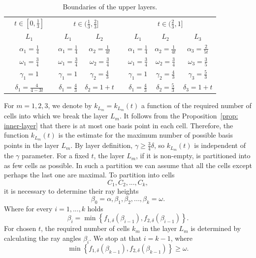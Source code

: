 \begin{table}
\centering
\begin{tabular}{@{}ccccccccc@{}}\toprule
& \multicolumn{1}{c}{$t \in [0,\frac{1}{3}]$} & \phantom{abc}& \multicolumn{2}{c}{$t \in (\frac{1}{3},\frac{2}{3}]$} &
\phantom{abc} & \multicolumn{3}{c}{$t \in (\frac{2}{3},1]$}\\
\cmidrule{2-2} \cmidrule{3-4} \cmidrule{5-9}
         & $L_{1}$               && $L_{1}$       			  & $L_{2}$          		   && $L_{1}$       & $L_{2}$         & $L_{3}$  \\ \midrule
 & $\alpha_{1} = \frac{1}{4}$    && $\alpha_{1} = \frac{1}{4}$ & $\alpha_{2} = \frac{1}{4t}$ && $\alpha_{1} = \frac{1}{4}$ & $\alpha_{2} = \frac{1}{4t}$  & $\alpha_{3} = \frac{2}{5t}$ \\[0.2cm]
 & $\omega_{1} = \frac{3}{4}$    && $\omega_{1} = \frac{3}{4}$ & $\omega_{2} = \frac{3}{4}$  && $\omega_{1} = \frac{3}{4}$ & $\omega_{2} = \frac{3}{4}$   & $\omega_{3} = \frac{3}{5}$ \\[0.2cm]
 & $\gamma_{1} = 1$              && $\gamma_{1} = 1$           & $\gamma_{2} = \frac{4}{3}$  && $\gamma_{1} = 1$           & $\gamma_{2} = \frac{4}{3}$   & $\gamma_{3} = \frac{5}{3}$ \\[0.2cm]
 & $\delta_{1} = \frac{4}{4-3t}$ && $\delta_{1} = \frac{4}{3}$ & $\delta_{2} = 1 + t$        && $\delta_{1} = \frac{4}{3}$ & $\delta_{2} = \frac{5}{3}$   & $\delta_{3} = 1 + t$ \\
\bottomrule
\end{tabular}
\caption{Boundaries of the upper layers.}
\label{tab: upper-bounds-boundaries}
\end{table}

For $m = 1,2,3$, we denote by $k_{L_{m}} = k_{L_{m}}(t)$ a function of the required number of cells into which we break the layer $L_{m}$. It follows from the Proposition~\ref{prop: inner-layer} that there is at most one basis point in each cell. Therefore, the function $k_{L_{m}}(t)$ is the estimate for the maximum number of possible basis points in the layer $L_{m}$. By layer definition, $\gamma \geq \frac{3}{4}\delta$, so $k_{L_{m}}(t)$ is independent of the $\gamma$ parameter. For a fixed $t$, the layer $L_{m}$, if it is non-empty, is partitioned into as few cells as possible. In such a partition we can assume that all the cells except perhaps the last one are maximal. To partition into cells
$$
C_{1}, C_{2}, ..., C_{k},
$$
it is necessary to determine their ray heights
$$
\beta_{0} = \alpha, \beta_{1}, \beta_{2},..., \beta_{k} = \omega.
$$
Where for every $i = 1, ..., k$ holds
$$
\beta_{i} = \min\left\{ f_{1,\delta}(\beta_{i-1}), f_{2,\delta}(\beta_{i-1}) \right\}.
$$
For chosen $t$, the required number of cells $k_{m}$ in the layer $L_{m}$ is determined by calculating the ray angles $\beta_{i}$. We stop at that $i = k - 1$, where
$$
\min\left\{ f_{1,\delta}(\beta_{k-1}), f_{2,\delta}(\beta_{k-1}) \right\} \geq \omega.
$$

